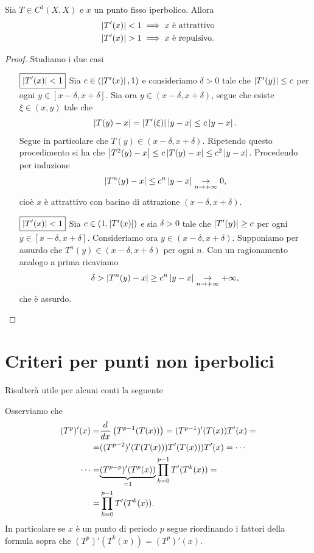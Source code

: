 \begin{proposition}\label{RelazioneTraPuntiIperboliciEAttrattivita}
Sia $T\in C^1(X,X)$ e $x$ un punto fisso iperbolico. Allora 
\begin{align*}
\abs{T'(x)}<1&\implies x\text{ \`e attrattivo}\\
\abs{T'(x)}>1&\implies x\text{ \`e repulsivo.}
\end{align*}
\end{proposition}
\begin{proof}
Studiamo i due casi
\setlength{\leftmargini}{0cm}
\begin{itemize}
\item[$\boxed{\left|{T'(x)}\right|<1}$] Sia $c\in (\left|{T'(x)}\right|,1)$ e consideriamo $\delta>0$ tale che $\left|{T'(y)}\right|\leq c$ per ogni $y\in [x-\delta,x+\delta]$. Sia ora $y\in (x-\delta,x+\delta)$, segue che esiste $\xi\in (x,y)$ tale che
\[\left|{T(y)-x}\right|=\left|{T'(\xi)}\right|\left|{y-x}\right|\leq c\left|{y-x}\right|.\]
Segue in particolare che $T(y)\in (x-\delta,x+\delta)$. Ripetendo questo procedimento si ha che $\left|{T^2(y)-x}\right|\leq c\left|{T(y)-x}\right|\leq c^2\left|{y-x}\right|$. Procedendo per induzione
\[\left|{T^n(y)-x}\right|\leq c^n\left|{y-x}\right|\underset{n\to+\infty}{\to} 0,\]
cio\`e $x$ \`e attrattivo con bacino di attrazione $(x-\delta,x+\delta)$.
\item[$\boxed{\left|{T'(x)}\right|<1}$] Sia $c\in (1,\left|{T'(x)}\right|)$ e sia $\delta>0$ tale che $\left|{T'(y)}\right|\geq c$ per ogni $y\in [x-\delta,x+\delta]$. Consideriamo ora $y\in (x-\delta,x+\delta)$. Supponiamo per assurdo che $T^n(y)\in (x-\delta,x+\delta)$ per ogni $n$. Con un ragionamento analogo a prima ricaviamo
\[\delta>\left|{T^n(y)-x}\right|\geq c^n\left|{y-x}\right|\underset{n\to+\infty}{\to}+\infty,\]
che \`e assurdo.
\end{itemize}
\setlength{\leftmargini}{0.5cm}
\end{proof}

\section{Criteri per punti non iperbolici}
Risulter\`a utile per alcuni conti la seguente
\begin{remark}
Osserviamo che
\begin{align*}
(T^p)'(x)=&\dd x{}\pa{T^{p-1}(T(x))}=(T^{p-1})'(T(x))T'(x)=\\
=&((T^{p-2})'(T(T(x)))T'(T(x)))T'(x)=\cdots\\
\cdots=&\under{=1}{(T^{p-p})'(T^p(x))}\prod_{k=0}^{p-1}T'(T^k(x))=\\
=&\prod_{k=0}^{p-1}T'(T^k(x)).
\end{align*}
In particolare se $x$ \`e un punto di periodo $p$ segue riordinando i fattori della formula sopra che $(T^p)'(T^k(x))=(T^p)'(x)$.
\end{remark}


